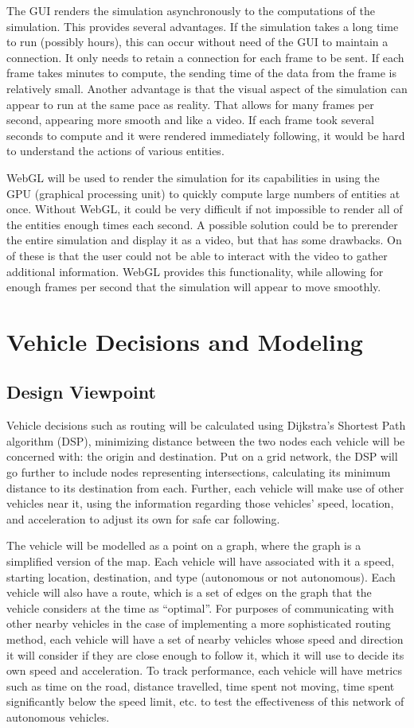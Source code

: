 \documentclass[onecolumn, draftclsnofoot,10pt, compsoc]{IEEEtran}
\begin{document}
The GUI renders the simulation asynchronously to the computations of the simulation.
This provides several advantages.
If the simulation takes a long time to run (possibly hours), this can occur without need of the GUI to maintain a connection.
It only needs to retain a connection for each frame to be sent.
If each frame takes minutes to compute, the sending time of the data from the frame is relatively small.
Another advantage is that the visual aspect of the simulation can appear to run at the same pace as reality.
That allows for many frames per second, appearing more smooth and like a video.
If each frame took several seconds to compute and it were rendered immediately following, it would be hard to understand the actions of various entities.

WebGL will be used to render the simulation for its capabilities in using the GPU (graphical processing unit) to quickly compute large numbers of entities at once.
Without WebGL, it could be very difficult if not impossible to render all of the entities enough times each second.
A possible solution could be to prerender the entire simulation and display it as a video, but that has some drawbacks.
On of these is that the user could not be able to interact with the video to gather additional information.
WebGL provides this functionality, while allowing for enough frames per second that the simulation will appear to move smoothly.
\section{Vehicle Decisions and Modeling}
\subsection{Design Viewpoint}
Vehicle decisions such as routing will be calculated using Dijkstra’s Shortest Path algorithm (DSP), minimizing distance between the two nodes each vehicle will be concerned with: the origin and destination.
Put on a grid network, the DSP will go further to include nodes representing intersections, calculating its minimum distance to its destination from each.
Further, each vehicle will make use of other vehicles near it, using the information regarding those vehicles' speed, location, and acceleration to adjust its own for safe car following.

The vehicle will be modelled as a point on a graph, where the graph is a simplified version of the map.
Each vehicle will have associated with it a speed, starting location, destination, and type (autonomous or not autonomous).
Each vehicle will also have a route, which is a set of edges on the graph that the vehicle considers at the time as “optimal”.
For purposes of communicating with other nearby vehicles in the case of implementing a more sophisticated routing method, each vehicle will have a set of nearby vehicles whose speed and direction it will consider if they are close enough to follow it, which it will use to decide its own speed and acceleration.
To track performance, each vehicle will have metrics such as time on the road, distance travelled, time spent not moving, time spent significantly below the speed limit, etc. to test the effectiveness of this network of autonomous vehicles.
\end{document}
